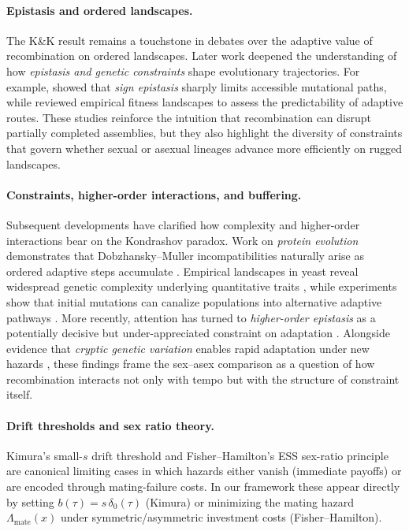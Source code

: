 \documentclass[11pt]{article}
\theoremstyle{upright}
\begin{document}
\paragraph{Epistasis and ordered landscapes.}
The K\&K result remains a touchstone in debates over the adaptive value of recombination on ordered landscapes. Later work deepened the understanding of how \emph{epistasis and genetic constraints} shape evolutionary trajectories. For example, \citet{Weinreich2005} showed that \emph{sign epistasis} sharply limits accessible mutational paths, while \citet{deVisser2014} reviewed empirical fitness landscapes to assess the predictability of adaptive routes. These studies reinforce the intuition that recombination can disrupt partially completed assemblies, but they also highlight the diversity of constraints that govern whether sexual or asexual lineages advance more efficiently on rugged landscapes.

\paragraph{Constraints, higher-order interactions, and buffering.}
Subsequent developments have clarified how complexity and higher-order interactions bear on the Kondrashov paradox. Work on \emph{protein evolution} demonstrates that Dobzhansky–Muller incompatibilities naturally arise as ordered adaptive steps accumulate \citep{Kondrashov2002}. Empirical landscapes in yeast reveal widespread genetic complexity underlying quantitative traits \citep{Brem2005}, while experiments show that initial mutations can canalize populations into alternative adaptive pathways \citep{Salverda2011}. More recently, attention has turned to \emph{higher-order epistasis} as a potentially decisive but under-appreciated constraint on adaptation \citep{Weinreich2013}. Alongside evidence that \emph{cryptic genetic variation} enables rapid adaptation under new hazards \citep{Hayden2011}, these findings frame the sex–asex comparison as a question of how recombination interacts not only with tempo but with the structure of constraint itself.

\paragraph{Drift thresholds and sex ratio theory.}
Kimura’s small-$s$ drift threshold and Fisher--Hamilton’s ESS sex-ratio principle are canonical limiting cases in which hazards either vanish (immediate payoffs) or are encoded through mating-failure costs. In our framework these appear directly by setting $b(\tau)=s\,\delta_0(\tau)$ (Kimura) or minimizing the mating hazard $\Lambda_{\mathrm{mate}}(x)$ under symmetric/asymmetric investment costs (Fisher--Hamilton).
\end{document}
